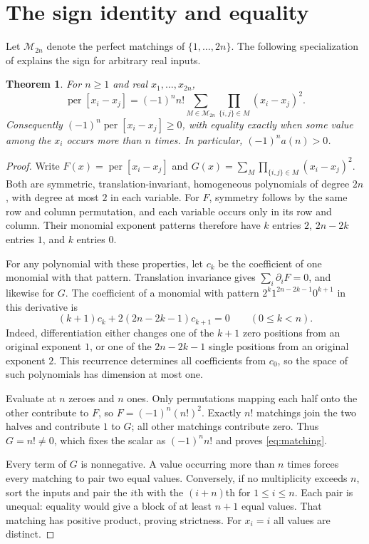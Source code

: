 \documentclass[11pt]{article}
\newcommand{\per}{\operatorname{per}}
\newtheorem{theorem}{Theorem}
\begin{document}
\section{The sign identity and equality}
Let $\mathcal M_{2n}$ denote the perfect matchings of $\{1,\ldots,2n\}$.
The following specialization of \cite[Section 5, pp.~24--25]{ksy}
explains the sign for arbitrary real inputs.
\begin{theorem}\label{matching}
For $n\ge1$ and real $x_1,\ldots,x_{2n}$,
\begin{equation}\label{eq:matching}
 \per[x_i-x_j]=(-1)^n n!\sum_{M\in\mathcal M_{2n}}
                       \prod_{\{i,j\}\in M}(x_i-x_j)^2.
\end{equation}
Consequently $(-1)^n\per[x_i-x_j]\ge0$, with equality exactly
when some value among the $x_i$ occurs more than $n$ times.
In particular, $(-1)^n a(n)>0$.
\end{theorem}
\begin{proof}
Write $F(x)=\per[x_i-x_j]$ and
$G(x)=\sum_M\prod_{\{i,j\}\in M}(x_i-x_j)^2$.
Both are symmetric, translation-invariant, homogeneous polynomials
of degree $2n$, with degree at most $2$ in each variable.
For $F$, symmetry follows by the same row and column permutation,
and each variable occurs only in its row and column.
Their monomial exponent patterns therefore have $k$ entries $2$,
$2n-2k$ entries $1$, and $k$ entries $0$.

For any polynomial with these properties, let $c_k$ be the coefficient
of one monomial with that pattern. Translation invariance gives
$\sum_i\partial_i F=0$, and likewise for $G$.
The coefficient of a monomial with pattern
$2^k1^{2n-2k-1}0^{k+1}$ in this derivative is
\[
 (k+1)c_k+2(2n-2k-1)c_{k+1}=0\qquad(0\le k<n).
\]
Indeed, differentiation either changes one of the $k+1$ zero
positions from an original exponent $1$, or one of the
$2n-2k-1$ single positions from an original exponent $2$.
This recurrence determines all coefficients from $c_0$, so the
space of such polynomials has dimension at most one.

Evaluate at $n$ zeroes and $n$ ones. Only permutations mapping each
half onto the other contribute to $F$, so $F=(-1)^n(n!)^2$.
Exactly $n!$ matchings join the two halves and contribute $1$ to
$G$; all other matchings contribute zero. Thus $G=n!\ne0$,
which fixes the scalar as $(-1)^n n!$ and proves
\eqref{eq:matching}.

Every term of $G$ is nonnegative. A value occurring more than $n$
times forces every matching to pair two equal values.
Conversely, if no multiplicity exceeds $n$, sort the inputs and
pair the $i$th with the $(i+n)$th for $1\le i\le n$.
Each pair is unequal: equality would give a block of at least $n+1$
equal values. That matching has positive product, proving strictness.
For $x_i=i$ all values are distinct.
\end{proof}
\end{document}

